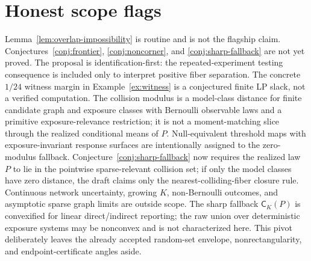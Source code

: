 \documentclass[11pt]{article}
\theoremstyle{definition}
\theoremstyle{plain}
\theoremstyle{remark}
\begin{document}
\section{Honest scope flags}
Lemma~\ref{lem:overlap-impossibility} is routine and is not the flagship claim.  Conjectures~\ref{conj:frontier}, \ref{conj:noncorner}, and \ref{conj:sharp-fallback} are not yet proved.  The proposal is identification-first: the repeated-experiment testing consequence is included only to interpret positive fiber separation.  The concrete \(1/24\) witness margin in Example~\ref{ex:witness} is a conjectured finite LP slack, not a verified computation.  The collision modulus is a model-class distance for finite candidate graph and exposure classes with Bernoulli observable laws and a primitive exposure-relevance restriction; it is not a moment-matching slice through the realized conditional means of \(P\).  Null-equivalent threshold maps with exposure-invariant response surfaces are intentionally assigned to the zero-modulus fallback.  Conjecture~\ref{conj:sharp-fallback} now requires the realized law \(P\) to lie in the pointwise sparse-relevant collision set; if only the model classes have zero distance, the draft claims only the nearest-colliding-fiber closure rule.  Continuous network uncertainty, growing \(K\), non-Bernoulli outcomes, and asymptotic sparse graph limits are outside scope.  The sharp fallback \(\mathsf C_K(P)\) is convexified for linear direct/indirect reporting; the raw union over deterministic exposure systems may be nonconvex and is not characterized here.  This pivot deliberately leaves the already accepted random-set envelope, nonrectangularity, and endpoint-certificate angles aside.
\end{document}
